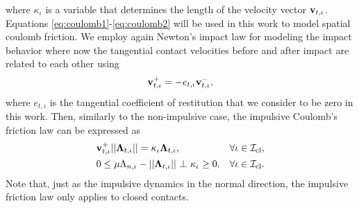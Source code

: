 \documentclass[../DC2017114Bouma.tex]{subfiles}
\begin{document}
where $\kappa_{\iota}$ is a variable that determines the length of the velocity vector $\mathbf{v}_{t,\iota}$. Equations \eqref{eq:coulomb1}-\eqref{eq:coulomb2} will be used in this work to model spatial coulomb friction. We employ again Newton's impact law for modeling the impact behavior where now the tangential contact velocities before and after impact are related to each other using
\begin{align}
\mathbf{v}^+_{t,\iota} = -e_{t,\iota}\mathbf{v}^-_{t,\iota},
\end{align}
where $e_{t,\iota}$ is the tangential coefficient of restitution that we consider to be zero in this work. Then, similarly to the non-impulsive case, the impulsive Coulomb's friction law can be expressed as
\begin{align}
&\vbf_{t,\iota}^+||\Lambdab_{t,\iota}|| = \kappa_{\iota}\Lambdab_{t,\iota},  &\forall \iota\in\Ic_{\text{cl}},\label{eq:coulombimp1}\\
&0 \leq \mu\Lambda_{n,\iota} - ||\Lambdab_{t,\iota}||\ \bot\ \kappa_{\iota} \geq 0. &\forall \iota\in\Ic_{\text{cl}}.\label{eq:coulombimp2}
\end{align}
Note that, just as the impulsive dynamics in the normal direction, the impulsive friction law only applies to closed contacts.
\end{document}
